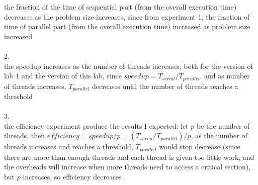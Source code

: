 \documentclass[12pt,border=4pt,multi]{article} %
\begin{document}
the fraction of the time of sequential part (from the overall execution time) decreases as the problem size increases, since from experiment 1, the fraction of time of parallel part (from the overall execution time) increased as problem size increased\\
\\
2.\\
the speedup increases as the number of threads increases, both for the version of lab 1 and the version of this lab, since $speedup = T_{serial} / T_{parallel}$, and as number of threads increases, $T_{parallel}$ decreases until the number of threads reaches a threshold\\
\\
3.\\
the efficiency experiment produce the results I expected: let $p$ be the number of threads, then $efficiency = speedup / p = (T_{serial} / T_{parallel}) / p$, as the number of threads increases and reaches a threshold, $T_{parallel}$ would stop decrease (since there are more than enough threads and each thread is given too little work, and the overheads will increase when more threads need to access a critical section), but $p$ increases, so efficiency decreases\\
\end{document}
